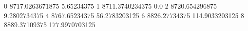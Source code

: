 0 8717.0263671875 5.65234375
1 8711.3740234375 0.0
2 8720.654296875 9.2802734375
4 8767.65234375 56.2783203125
6 8826.27734375 114.9033203125
8 8889.37109375 177.9970703125
